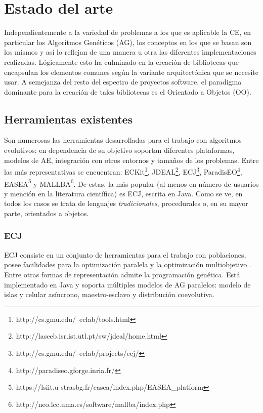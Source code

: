 \documentclass[runningheads]{llncs}
\begin{document}


\section{Estado del arte}
\label{sec:fprog2ae}

Independientemente a la variedad de problemas a los que es aplicable
la CE, en particular los Algoritmos Genéticos (AG), los conceptos en
los que se basan son los mismos y así lo reflejan de una manera u otra
las diferentes implementaciones realizadas. Lógicamente esto ha
culminado en la creación de bibliotecas que encapsulan los elementos
comunes según la variante arquitectónica que se necesite usar. A
semejanza del resto del espectro de proyectos software, el paradigma
dominante para la creación de tales bibliotecas es el Orientado a
Objetos (OO). 

\subsection{Herramientas existentes}

Son numerosas las herramientas desarrolladas para el trabajo con
algoritmos evolutivos; en dependencia de su objetivo soportan
diferentes plataformas, modelos de AE, integración con otros entornos
y tamaños de los problemas. Entre las más representativas se
encuentran: ECKit\footnote{http://cs.gmu.edu/~eclab/tools.html},
JDEAL\footnote{http://laseeb.isr.ist.utl.pt/sw/jdeal/home.html},
ECJ\footnote{http://cs.gmu.edu/~eclab/projects/ecj/},
ParadisEO\footnote{http://paradiseo.gforge.inria.fr/},
EASEA\footnote{https://lsiit.u-strasbg.fr/easea/index.php/EASEA\_platform}
y MALLBA\footnote{http://neo.lcc.uma.es/software/mallba/index.php}. De
estas, la más popular (al menos en número de usuarios y mención en la
literatura científica) es ECJ, escrita en Java. Como se ve, en todos
los casos se trata de lenguajes {\em tradicionales}, procedurales o,
en su mayor parte, orientados a objetos.


\subsubsection{ECJ}

ECJ consiste en un conjunto de herramientas para el trabajo con poblaciones, posee facilidades para la optimización paralela y la optimización multiobjetivo \cite{Luke2010}. Entre otras formas de representación admite la programación genética. Está implementado en Java y soporta múltiples modelos de AG paralelos: modelo de islas y celular asíncrono, maestro-esclavo y distribución coevolutiva.
\end{document}
